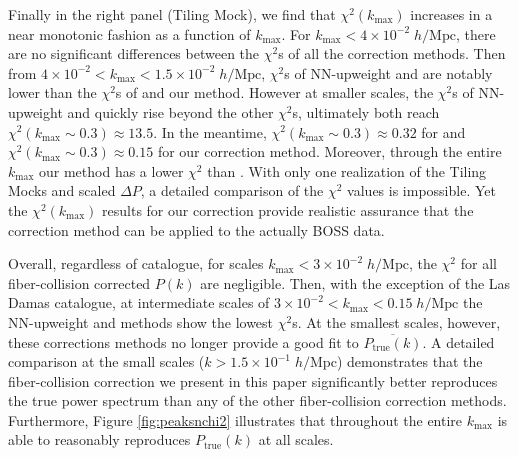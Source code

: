 \documentclass{emulateapj}
\begin{document}
Finally in the right panel (Tiling Mock), we find that $\chi^2(k_\mathrm{max})$ increases in a near monotonic fashion as a function of $k_\mathrm{max}$. For $k_\mathrm{max} < 4\times10^{-2} \; h/\mathrm{Mpc}$, there are no significant differences between the $\chi^2$s of all the correction methods. Then from $4\times10^{-2} < k_\mathrm{max} < 1.5\times 10^{-2} \; h/\mathrm{Mpc}$, $\chi^2$s of NN-upweight and \cite{Beutelr:2014aa} are notably lower than the $\chi^2$s of \cite{Gil-Marin:2014aa} and our method. However at smaller scales, the $\chi^2$s of NN-upweight and \cite{Beutelr:2014aa} quickly rise beyond the other $\chi^2$s, ultimately both reach $\chi^2(k_\mathrm{max} \sim 0.3) \approx 13.5$. In the meantime, $\chi^2(k_\mathrm{max} \sim 0.3) \approx 0.32$ for \cite{Gil-Marin:2014aa} and $\chi^2(k_\mathrm{max} \sim 0.3) \approx 0.15$ for our correction method. Moreover, through the entire $k_\mathrm{max}$ our method has a lower $\chi^2$ than \cite{Gil-Marin:2014aa}. With only one realization of the Tiling Mocks and scaled $\Delta P$, a detailed comparison of the $\chi^2$ values is impossible. Yet the $\chi^2(k_\mathrm{max})$ results for our correction provide realistic assurance that the correction method can be applied to the actually BOSS data.

Overall, regardless of catalogue, for scales $k_\mathrm{max} < 3 \times 10^{-2} \;h/\mathrm{Mpc}$, the $\chi^2$ for all fiber-collision corrected $P(k)$ are negligible. Then, with the exception of the Las Damas catalogue, at intermediate scales of $3 \times 10^{-2} < k_\mathrm{max} < 0.15 \; h/\mathrm{Mpc}$ the NN-upweight and \cite{Beutler:2014aa} methods show the lowest $\chi^2$s. At the smallest scales, however, these corrections methods no longer provide a good fit to $\overline{P_\mathrm{true}(k)}$. A detailed comparison at the small scales ($k > 1.5 \times 10^{-1} \;h/\mathrm{Mpc}$) demonstrates that the fiber-collision correction we present in this paper significantly better reproduces the true power spectrum than any of the other fiber-collision correction methods. Furthermore, Figure \ref{fig:peaksnchi2} illustrates that throughout the entire $k_\mathrm{max}$ is able to reasonably reproduces $P_\mathrm{true}(k)$ at all scales. 

\end{document}
